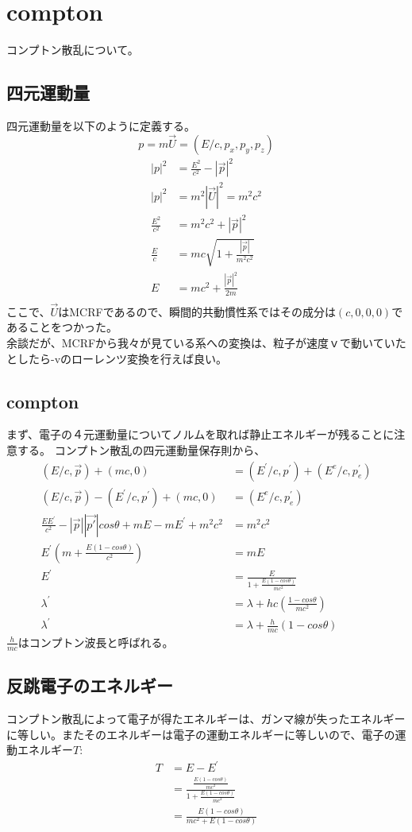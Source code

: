 \documentclass{jsarticle}
\begin{document}
\section{compton}
コンプトン散乱について。
\subsection{四元運動量}
四元運動量を以下のように定義する。
\begin{equation}
    p = m\vec{U}= (E/c, p_x, p_y, p_z)
\end{equation}
\begin{align}
    |p|^2 &= \frac{E^2}{c^2} - |\vec{p}|^2\\
    |p|^2 &= m^2 |\vec{U}|^2 = m^2c^2\\
    \frac{E^2}{c^2} &= m^2c^2 + |\vec{p}|^2\\
    \frac{E}{c} &= mc \sqrt{1 + \frac{|\vec{p}|}{m^2c^2}}\\
    E &= mc^2 + \frac{|\vec{p}|^2}{2m}\\  
\end{align}
ここで、$\vec{U}$はMCRFであるので、瞬間的共動慣性系ではその成分は$(c, 0, 0, 0)$であることをつかった。\\
余談だが、MCRFから我々が見ている系への変換は、粒子が速度ｖで動いていたとしたら-vのローレンツ変換を行えば良い。
\subsection{compton}
まず、電子の４元運動量についてノルムを取れば静止エネルギーが残ることに注意する。
コンプトン散乱の四元運動量保存則から、
\begin{align}
    (E/c, \vec{p}) + (mc, 0) &= (E^\prime / c, p^\prime) + (E^e / c, p_e^\prime)\\
    (E/c, \vec{p}) -(E^\prime/c, p^\prime) +  (mc, 0) &= (E^e / c, p_e^\prime)\\
    \frac{EE^\prime}{c^2} - |\vec{p}||\vec{p\prime}|cos\theta + mE - mE^\prime + m^2c^2 &= m^2c^2\\
    E^\prime (m + \frac{E(1 - cos\theta)}{c^2}) &= mE\\
    E^\prime &= \frac{E}{1 + \frac{E(1 - cos\theta)}{mc^2}}\\
    \lambda^\prime &= \lambda + hc(\frac{1-cos\theta}{mc^2})\\
    \lambda^\prime &= \lambda + \frac{h}{mc}(1-cos\theta)
\end{align}
$\frac{h}{mc}$はコンプトン波長と呼ばれる。
\subsection{反跳電子のエネルギー}
コンプトン散乱によって電子が得たエネルギーは、ガンマ線が失ったエネルギーに等しい。またそのエネルギーは電子の運動エネルギーに等しいので、電子の運動エネルギー$T$:
\begin{align}
    T &= E - E^{\prime}\\
    &= \frac{\frac{E(1 - cos\theta)}{mc^2}}{1 + \frac{E(1 - cos\theta)}{mc^2}}\\
    &= \frac{E(1 - cos\theta)}{mc^2 + E(1 - cos\theta)}
\end{align}
\end{document}
